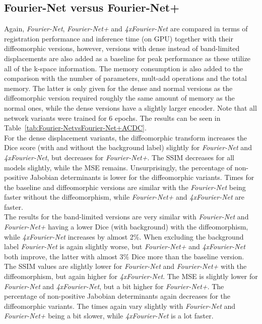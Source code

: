 \subsection{Fourier-Net versus Fourier-Net+} \label{SubSec:ResultsFourier-NetvsFourier-Net+ACDC}
Again, \emph{Fourier-Net}, \emph{Fourier-Net+} and \emph{4xFourier-Net} are compared in terms of registration performance and inference time (on GPU) together with their diffeomorphic versions, however, versions with dense instead of band-limited displacements are also added as a baseline for peak performance as these utilize all of the k-space information. The memory consumption is also added to the comparison with the number of parameters, mult-add operations and the total memory. The latter is only given for the dense and normal versions as the diffeomorphic version required roughly the same amount of memory as the normal ones, while the dense versions have a slightly larger encoder. 
Note that all network variants were trained for 6 epochs. The results can be seen in Table~\ref{tab:Fourier-NetvsFourier-Net+ACDC}.\\
For the dense displacement variants, the diffeomorphic transform increases the Dice score (with and without the background label) slightly for \emph{Fourier-Net} and \emph{4xFourier-Net}, but decreases for \emph{Fourier-Net+}. The SSIM decreases for all models slightly, while the MSE remains. Unsurprisingly, the percentage of non-positive Jabobian determinants is lower for the diffeomorphic variants. Times for the baseline and diffeomorphic versions are similar with the \emph{Fourier-Net} being faster without the diffeomorphism, while \emph{Fourier-Net+} and \emph{4xFourier-Net} are faster. \\
The results for the band-limited versions are very similar with \emph{Fourier-Net} and \emph{Fourier-Net+} having a lower Dice (with background) with the diffeomorphism, while \emph{4xFourier-Net} increases by almost 2$\%$. When excluding the background label \emph{Fourier-Net} is again slightly worse, but \emph{Fourier-Net+} and \emph{4xFourier-Net} both improve, the latter with almost 3$\%$ Dice more than the baseline version. The SSIM values are slightly lower for \emph{Fourier-Net} and \emph{Fourier-Net+} with the diffeomorphism, but again higher for \emph{4xFourier-Net}. The MSE is slightly lower for \emph{Fourier-Net} and \emph{4xFourier-Net}, but a bit higher for \emph{Fourier-Net+}. The percentage of non-positive Jabobian determinants again decreases for the diffeomorphic variants. The times again vary slightly with \emph{Fourier-Net} and \emph{Fourier-Net+} being a bit slower, while \emph{4xFourier-Net} is a lot faster.\\
